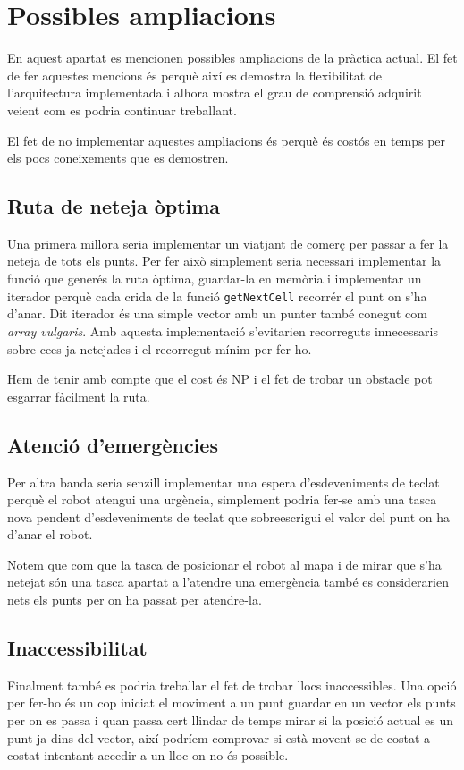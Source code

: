 \section{Possibles ampliacions}

En aquest apartat es mencionen possibles ampliacions de la pràctica actual. El fet de fer aquestes mencions
és perquè així es demostra la flexibilitat de l'arquitectura implementada i alhora mostra el grau
de comprensió adquirit veient com es podria continuar treballant.

El fet de no implementar aquestes ampliacions és perquè és costós en temps per
els pocs coneixements que es demostren.

\subsection{Ruta de neteja òptima}
Una primera millora seria implementar un viatjant de comerç per passar a fer la neteja de tots els punts.
Per fer això simplement seria necessari implementar la funció que generés la ruta òptima, guardar-la en 
memòria i implementar un iterador perquè cada crida de la funció \texttt{getNextCell} recorrér el punt on s'ha d'anar.
Dit iterador és una simple vector amb un punter també conegut com \emph{array vulgaris}.
Amb aquesta implementació s'evitarien recorreguts innecessaris sobre ce\lgem es
ja netejades i el recorregut mínim per fer-ho.

Hem de tenir amb compte que el cost és NP i el fet de trobar un obstacle pot esgarrar fàcilment la ruta.

\subsection{Atenció d'emergències}
Per altra banda seria senzill implementar una espera d'esdeveniments de teclat perquè el robot atengui una urgència,
simplement podria fer-se amb una tasca nova pendent d'esdeveniments de teclat que sobreescrigui el valor del  punt
on ha d'anar el robot.

Notem que com que la tasca de posicionar el robot al mapa i de mirar que s'ha netejat són una tasca apartat
a l'atendre una emergència també es considerarien nets els punts per on ha passat per atendre-la.

\subsection{Inaccessibilitat}
Finalment també es podria treballar el fet de trobar llocs inaccessibles. Una opció per fer-ho
és un cop iniciat el moviment a un punt guardar en un vector els punts per on
es passa i quan passa cert llindar de temps mirar si la posició actual es un
punt ja dins del vector, així podríem comprovar si està movent-se de costat a
costat intentant accedir a un lloc on no és possible.

